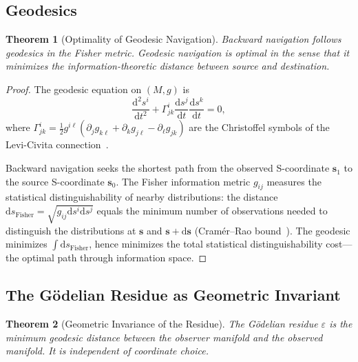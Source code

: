 \documentclass[11pt,twocolumn,a4paper]{article}
\newtheorem{theorem}{Theorem}[section]
\theoremstyle{definition}
\newcommand{\eps}{\varepsilon}
\newcommand{\dif}{\mathrm{d}}
\begin{document}
\subsection{Geodesics}\label{sec:infogeo:geodesics}

\begin{theorem}[Optimality of Geodesic Navigation]\label{thm:geodesic_optimal}
Backward navigation follows geodesics in the Fisher metric. Geodesic navigation is
optimal in the sense that it minimizes the information-theoretic distance between source
and destination.
\end{theorem}

\begin{proof}
The geodesic equation on $(M, g)$ is
\begin{equation}\label{eq:geodesic}
  \frac{\dif^2 s^i}{\dif t^2} + \Gamma^i_{jk} \frac{\dif s^j}{\dif t} \frac{\dif s^k}{\dif t} = 0,
\end{equation}
where $\Gamma^i_{jk} = \frac{1}{2}g^{i\ell}(\partial_j g_{k\ell} + \partial_k g_{j\ell}
- \partial_\ell g_{jk})$ are the Christoffel symbols of the Levi-Civita
connection~\cite{nakahara2003}.

Backward navigation seeks the shortest path from the observed S-coordinate
$\mathbf{s}_1$ to the source S-coordinate $\mathbf{s}_0$. The Fisher information metric
$g_{ij}$ measures the statistical distinguishability of nearby distributions: the distance
$\dif s_{\mathrm{Fisher}} = \sqrt{g_{ij}\dif s^i \dif s^j}$ equals the minimum number of
observations needed to distinguish the distributions at $\mathbf{s}$ and
$\mathbf{s} + \dif\mathbf{s}$ (Cram\'er--Rao bound~\cite{cover2006}). The geodesic
minimizes $\int \dif s_{\mathrm{Fisher}}$, hence minimizes the total statistical
distinguishability cost---the optimal path through information space.
\end{proof}

\subsection{The G\"odelian Residue as Geometric Invariant}\label{sec:infogeo:residue}

\begin{theorem}[Geometric Invariance of the Residue]\label{thm:residue_invariant}
The G\"odelian residue $\eps$ is the minimum geodesic distance between the observer
manifold and the observed manifold. It is independent of coordinate choice.
\end{theorem}
\end{document}
